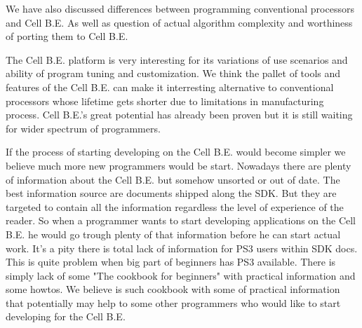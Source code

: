 \par
We have also discussed differences between programming conventional processors and Cell B.E.
As well as question of actual algorithm complexity and worthiness of porting them to Cell B.E.

\par
The Cell B.E. platform is very interesting for its variations of use scenarios and ability of program tuning and customization.
We think the pallet of tools and features of the Cell B.E. can make it interresting alternative to conventional processors whose lifetime gets shorter due to limitations in manufacturing process.
Cell B.E.'s great potential has already been proven but it is still waiting for wider spectrum of programmers.

\par
If the process of starting developing on the Cell B.E. would become simpler we believe much more new programmers would be start.
Nowadays there are plenty of information about the Cell B.E. but somehow unsorted or out of date.
The best information source are documents shipped along the SDK.
But they are targeted to contain all the information regardless the level of experience of the reader.
So when a programmer wants to start developing applications on the Cell B.E. he would go trough plenty of that information before he can start actual work.
It's a pity there is total lack of information for PS3 users within SDK docs.
This is quite problem when big part of beginners has PS3 available.
There is simply lack of some "The cookbook for beginners" with practical information and some howtos.
We believe is such cookbook with some of practical information that potentially may help to some other programmers who would like to start developing for the Cell B.E.